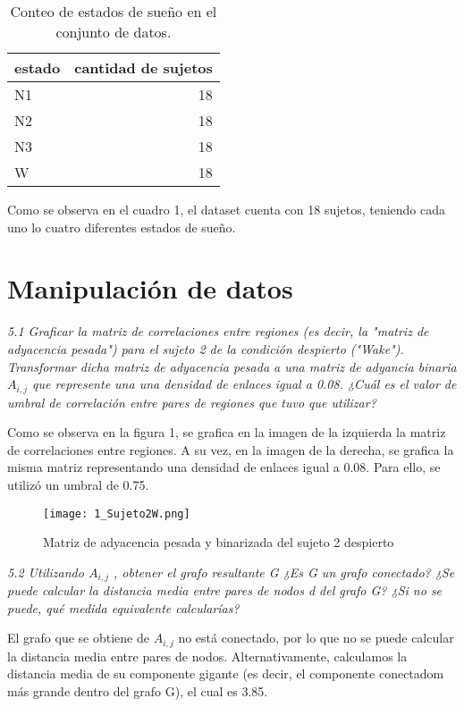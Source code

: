 \documentclass{article}
\begin{document}
\begin{table}[h]
  \centering
  \caption{Conteo de estados de sueño en el conjunto de datos.}
  \label{tab:estados_sueno}
  \begin{tabular}{lr}
    \toprule
    estado & cantidad de sujetos \\
    \midrule
    N1 & 18 \\
    N2 & 18 \\
    N3 & 18 \\
    W & 18 \\
    \bottomrule
  \end{tabular}
\end{table}

Como se observa en el cuadro 1, el dataset cuenta con 18 sujetos, teniendo cada uno lo
cuatro diferentes estados de sueño.

\section{Manipulación de datos}

\textit{5.1 Graﬁcar la matriz de correlaciones entre regiones (es decir, la "matriz de adyacencia
pesada") para el sujeto 2 de la condición despierto ("Wake"). Transformar dicha matriz de adyacencia pesada a una matriz de adyancia binaria $A_{i,j}$
que represente una una densidad de enlaces igual a 0.08. ¿Cuál es el valor de umbral de correlación entre pares de regiones que tuvo que utilizar?}

Como se observa en la figura 1, se grafica en la imagen de la izquierda la matriz de
correlaciones entre regiones. A su vez, en la imagen de la derecha, se grafica la misma
matriz representando una densidad de enlaces igual a 0.08. Para ello, se utilizó un umbral
de 0.75.

\begin{figure}[H]
  \centering  
  \texttt{[image: 1\_Sujeto2W.png]}
  \caption{Matriz de adyacencia pesada y binarizada del sujeto 2 despierto}
\end{figure}


\textit{5.2 Utilizando $A_{i,j}$ , obtener el grafo resultante G ¿Es G un grafo conectado? ¿Se puede calcular la distancia media entre pares de nodos
d del grafo G? ¿Si no se puede, qué medida equivalente calcularías?}

El grafo que se obtiene de $A_{i,j}$ no está conectado, por lo que no se puede calcular
la distancia media entre pares de nodos. Alternativamente, calculamos la distancia media de su
componente gigante (es decir, el componente conectadom más grande dentro del grafo G),
el cual es 3.85.
\end{document}
